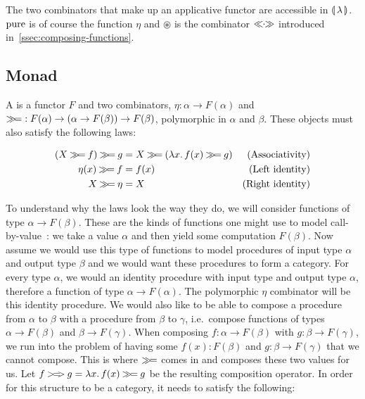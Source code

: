 The two combinators that make up an applicative functor are accessible in
$\llparenthesis \, \lambda \, \rrparenthesis$. $\operatorname{pure}$ is of course the function $\eta$ and $\circledast$ is
the combinator $\mathbin{\ll\!\!\cdot\!\!\gg}$ introduced in~\ref{ssec:composing-functions}.


\subsection{Monad}
\label{ssec:monad}

\begin{definition}
  A  is a functor $F$ and two combinators,
  $\eta : \alpha \to F(\alpha)$ and
  $\mathbin{\gg\!=} : F(\alpha) \to (\alpha \to F(\beta)) \to F(\beta)$, polymorphic
  in $\alpha$ and $\beta$. These objects must also satisfy the following
  laws:

  \begin{align}
    (X \mathbin{\gg\!=} f) \mathbin{\gg\!=} g &= X \mathbin{\gg\!=} (\lambda x.\, f(x) \mathbin{\gg\!=} g)
    & \label{law:monad-assoc} \text{(Associativity)} \\
    \eta(x) \mathbin{\gg\!=} f &= f(x)
    & \label{law:monad-left-id} \text{(Left identity)} \\
    X \mathbin{\gg\!=} \eta &= X
    & \label{law:monad-right-id} \text{(Right identity)}
  \end{align}
\end{definition}

To understand why the laws look the way they do, we will consider functions
of type $\alpha \to F(\beta)$. These are the kinds of functions one might
use to model call-by-value~\cite{moggi1991notions,moggi1990abstract}: we
take a value $\alpha$ and then yield some computation $F(\beta)$. Now
assume we would use this type of functions to model procedures of input
type $\alpha$ and output type $\beta$ and we would want these procedures to
form a category. For every type $\alpha$, we would an identity procedure
with input type and output type $\alpha$, therefore a function of type
$\alpha \to F(\alpha)$. The polymorphic $\eta$ combinator will be this
identity procedure. We would also like to be able to compose a procedure
from $\alpha$ to $\beta$ with a procedure from $\beta$ to $\gamma$, i.e.\
compose functions of types $\alpha \to F(\beta)$ and $\beta \to
F(\gamma)$. When composing $f : \alpha \to F(\beta)$ with
$g : \beta \to F(\gamma)$, we run into the problem of having some
$f(x) : F(\beta)$ and $g : \beta \to F(\gamma)$ that we cannot
compose. This is where $\mathbin{\gg\!=}$ comes in and composes these two values for
us. Let $f \mathbin{>\!=\!\!>} g = \lambda x.\, f(x) \mathbin{\gg\!=} g$ be the resulting
composition operator. In order for this structure to be a category, it
needs to satisfy the following:

